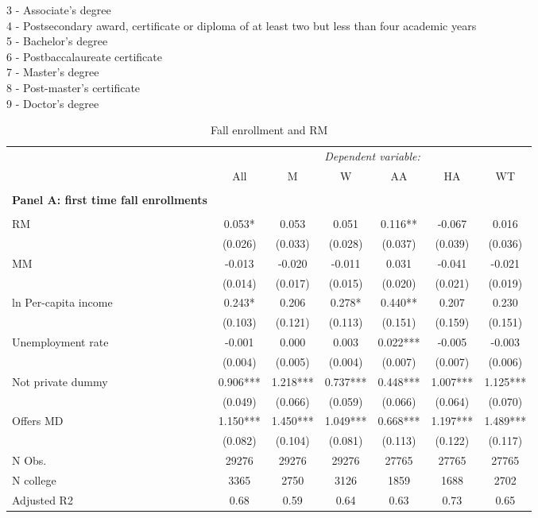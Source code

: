 \documentclass[12pt]{article}%
\begin{document}
3 - Associate's degree \\
4 - Postsecondary award, certificate or diploma of at least two but less than four academic years \\
5 - Bachelor's degree \\
6 - Postbaccalaureate certificate \\
7 - Master's degree \\
8 - Post-master's certificate \\
9 - Doctor's degree \\

\FloatBarrier
\begin{table}[!htbp] \centering 
  \begin{threeparttable}
    \caption{Fall enrollment and RM }
   \label{table:fe}
  \small
\begin{tabular}{@{\extracolsep{-6pt}}lcccccc} 
\toprule
 & \multicolumn{6}{c}{\textit{ Dependent variable:}} \\ 
\cline{2-7} 
& All & M & W & AA & HA & WT \\
\midrule  \\[-1.8ex] 
\textbf{Panel A: first time fall enrollments}\\ \\[-1.8ex] 
RM & 0.053* & 0.053 & 0.051 & 0.116** & -0.067 & 0.016 \\
& (0.026) & (0.033) & (0.028) & (0.037) & (0.039) & (0.036) \\
MM & -0.013 & -0.020 & -0.011 & 0.031 & -0.041 & -0.021 \\
& (0.014) & (0.017) & (0.015) & (0.020) & (0.021) & (0.019) \\
ln Per-capita income & 0.243* & 0.206 & 0.278* & 0.440** & 0.207 &
0.230 \\
& (0.103) & (0.121) & (0.113) & (0.151) & (0.159) & (0.151) \\
Unemployment rate & -0.001 & 0.000 & 0.003 & 0.022*** & -0.005 &
-0.003 \\
& (0.004) & (0.005) & (0.004) & (0.007) & (0.007) & (0.006) \\
Not private dummy & 0.906*** & 1.218*** & 0.737*** & 0.448*** & 1.007***
& 1.125*** \\
& (0.049) & (0.066) & (0.059) & (0.066) & (0.064) & (0.070) \\
Offers MD & 1.150*** & 1.450*** & 1.049*** & 0.668*** & 1.197*** &
1.489*** \\
& (0.082) & (0.104) & (0.081) & (0.113) & (0.122) & (0.117) \\
\hline
N Obs. & 29276 & 29276 & 29276 & 27765 & 27765 & 27765 \\
N college & 3365 & 2750 & 3126 & 1859 & 1688 & 2702 \\
Adjusted R2 & 0.68 & 0.59 & 0.64 & 0.63 & 0.73 & 0.65 \\



\end{tabular}
\end{threeparttable}
\end{table}
\end{document}
